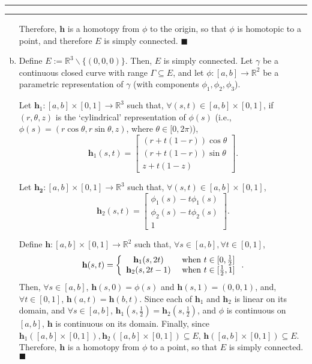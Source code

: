 \documentclass[11pt]{article}
\newcounter{questionCounter}
\newcounter{partCounter}[questionCounter]
\newenvironment{question}[2][\arabic{questionCounter}]{%
    \setcounter{partCounter}{0}%
    \vspace{.25in} \hrule \vspace{0.5em}%
        \noindent{\bf #2}%
    \vspace{0.8em} \hrule \vspace{.10in}%
    \addtocounter{questionCounter}{1}%
}{}
\begin{document}
\begin{question}{Problem 3}
\begin{enumerate}[(a)]
Therefore, $\mathbf{h}$ is a homotopy from $\phi$ to the origin, so that $\phi$
is homotopic to a point, and therefore $E$ is simply connected. \quad
$\blacksquare$


\item Define $E := \mathbb{R}^3\backslash\{(0,0,0)\}$. Then, $E$ is simply
connected.
Let $\gamma$ be a continuous closed curve with range $\Gamma \subseteq E$, and
let $\phi: [a,b] \rightarrow \mathbb{R}^2$ be a parametric representation of
$\gamma$ (with components $\phi_1,\phi_2,\phi_3$).

Let $\mathbf{h}_1: [a,b] \times [0,1] \rightarrow \mathbb{R}^3$ such that,
$\forall (s,t) \in [a,b] \times [0,1]$, if $(r,\theta,z)$ is the
`cylindrical' representation of $\phi(s)$
(i.e., $\phi(s) = (r \cos \theta, r \sin \theta, z)$, where
$\theta \in [0,2 \pi)$),
\[\mathbf{h}_1(s,t) =
                    \begin{bmatrix}
                        (r + t(1 - r)) \cos \theta \\
                        (r + t(1 - r)) \sin \theta \\
                        z + t(1 - z)
                    \end{bmatrix}
.\]

Let $\mathbf{h_2}: [a,b] \times [0,1] \rightarrow \mathbb{R}^3$ such that,
$\forall (s,t) \in [a,b] \times [0,1]$,
\[\mathbf{h}_2(s,t) =
                    \begin{bmatrix}
                        \phi_1(s) - t\phi_1(s) \\
                        \phi_2(s) - t\phi_2(s) \\
                        1
                    \end{bmatrix}
.\]

Define $\mathbf{h}: [a,b] \times [0,1] \rightarrow \mathbb{R}^2$ such that,
$\forall s \in [a,b], \forall t \in [0,1]$,
\[\mathbf{h}(s,t) = \left\{
                        \begin{array}{c c}
                                \mathbf{h}_1(s,2t)
                                  & \mbox{ when } t \in [0,\frac12]       \\
                                \mathbf{h}_2(s,2t - 1)
                                  & \mbox{ when } t \in [\frac12,1] \\
                        \end{array}
                    \right.
.\]
Then, $\forall s \in [a,b]$, $\mathbf{h}(s,0) = \phi(s)$ and
$\mathbf{h}(s,1) = (0,0,1)$, and, $\forall t \in [0,1]$,
$\mathbf{h}(a,t) = \mathbf{h}(b,t)$.
Since each of $\mathbf{h}_1$ and $\mathbf{h}_2$ is linear on its domain, and
$\forall s \in [a,b]$, $\mathbf{h}_1(s,\frac12) = \mathbf{h}_2(s,\frac12)$,
and $\phi$ is continuous on $[a,b]$, $\mathbf{h}$ is continuous on its domain.
Finally, since
$\mathbf{h}_1([a,b] \times [0,1]), \mathbf{h}_2([a,b] \times [0,1])
  \subseteq E$,
$\mathbf{h}([a,b] \times [0,1]) \subseteq E$.
Therefore, $\mathbf{h}$ is a homotopy from $\phi$ to a point, so that
$E$ is simply connected. \quad $\blacksquare$



\end{enumerate}
\end{question}
\end{document}
